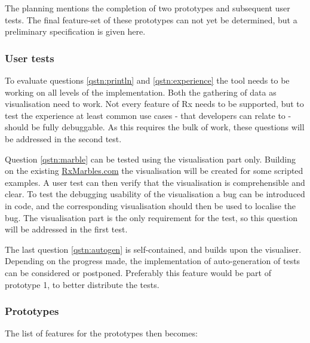 The planning mentions the completion of two prototypes and subsequent
user tests.  The final feature-set of these prototypes can not yet be
determined, but a preliminary specification is given here.

\subsubsection{User tests} To evaluate questions%
\ref{qstn:println} and%
\ref{qstn:experience} the tool needs to be working on all levels of the
implementation.  Both the gathering of data as visualisation need to
work.  Not every feature of Rx needs to be supported, but to test the
experience at least common use cases - that developers can relate to -
should be fully debuggable.  As this requires the bulk of work, these
questions will be addressed in the second test.

Question%
\ref{qstn:marble} can be tested using the visualisation part only.
Building on the existing \href{http://rxmarbles.com}{RxMarbles.com} the
visualisation will be created for some scripted examples.  A user test
can then verify that the visualisation is comprehensible and clear.  To
test the debugging usability of the visualisation a bug can be
introduced in code, and the corresponding visualisation should then be
used to localise the bug.  The visualisation part is the only
requirement for the test, so this question will be addressed in the
first test.

The last question%
\ref{qstn:autogen} is self-contained, and builds upon the visualiser.
Depending on the progress made, the implementation of auto-generation of
tests can be considered or postponed.  Preferably this feature would be
part of prototype 1, to better distribute the tests.

\subsubsection{Prototypes} The list of features for the prototypes then
becomes:


